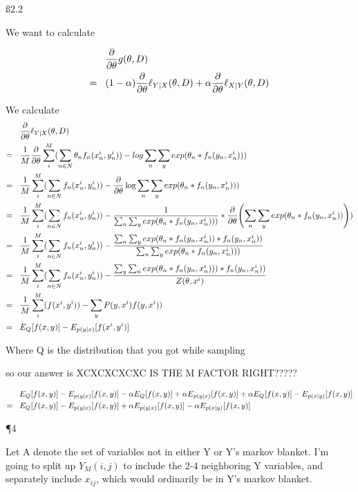 \ss{2.2}

We want to calculate 

\def\t{\pdv{\theta}}

\begin{align*}
& \pdv{\theta} g(\theta,D) \nl
(1-\alpha)\t\ell_{Y \mid X}(\theta, D) + \alpha\t\ell_{X \mid Y}(\theta,D)
\end{align*}

We calculate 
\begin{align*}
& \t\ell_{Y \mid X}(\theta, D) \nl \frac{1}{M}
\t \sum_i^M (\sum_{n \in N} \theta_n f_n(x_n^i,y_n^i)) - log \sum_n \sum_y exp(\theta_n * f_n(y_n,x_n^i))) \nl \frac{1}{M}
\sum_i^M (\sum_{n \in N} f_n(x_n^i,y_n^i)) - \t\log \sum_n \sum_y exp(\theta_n * f_n(y_n,x_n^i))) \nl \frac{1}{M}
\sum_i^M (\sum_{n \in N} f_n(x_n^i,y_n^i)) - \frac{1}{\sum_n \sum_y exp(\theta_n * f_n(y_n,x_n^i)))} * \t (\sum_n \sum_y exp(\theta_n * f_n(y_n,x_n^i)))) \nl \frac{1}{M}
\sum_i^M (\sum_{n \in N} f_n(x_n^i,y_n^i)) - \frac{\sum_n \sum_y exp(\theta_n * f_n(y_n,x_n^i)) * f_n(y_n,x_n^i))}{\sum_n \sum_y exp(\theta_n * f_n(y_n,x_n^i)))} \nl \frac{1}{M}
\sum_i^M (\sum_{n \in N} f_n(x_n^i,y_n^i)) - \frac{ \sum_y \sum_n exp(\theta_n * f_n(y_n,x_n^i))) * f_n(y_n,x_n^i))}{Z(\theta, x^i)} \nl
 \frac{1}{M} \sum_i^M (f(x^i,y^i)) - \sum_y P(y,x^i) f(y,x^i)) \nl
E_Q[f(x,y)] - E_{p(y \mid x)}[f(x^i,y^i)]
\end{align*}

 Where Q is the distribution that you got while sampling 
 
 so our answer is  XCXCXCXCXC IS THE M FACTOR RIGHT?????
 
\begin{align*}
 & E_Q[f(x,y)] - E_{p(y \mid x)}[f(x,y)] - \alpha E_Q[f(x,y)] + \alpha E_{p(y \mid x)}[f(x,y)] + \alpha E_Q[f(x,y)] - E_{p(x \mid y)}[f(x,y)] \\ = \hspace{3 mm} & E_Q[f(x,y)] - E_{p(y \mid x)}[f(x,y)] + \alpha E_{p(y \mid x)}[f(x,y)] - \alpha E_{p(x \mid y)}[f(x,y)]
\end{align*}

\P 4

Let A denote the set of variables not in either Y or Y's markov blanket. I'm going to split up $Y_M(i,j)$ to include the 2-4 neighboring Y variables, and separately include $x_{ij}$, which would ordinarily be in Y's markov blanket.

